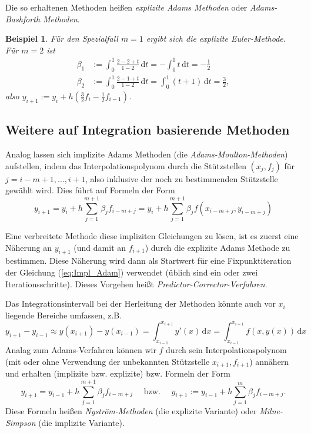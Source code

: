 \documentclass[12pt,a4paper]{book}
\theoremstyle{break}
\newtheorem{beispiel}[theorem]{Beispiel}
\theoremstyle{nonumberplain}
\newcommand{\1}{\mathbbm{1}} 			      	%
\newcommand{\dx}[1][x]{\ensuremath{\, \mathrm{d} #1}} 	%
\newcommand{\labeq}[1]{\label{eq:#1}}			%
\newcommand{\req}[1]{(\ref{eq:#1})}
\begin{document}
Die so erhaltenen Methoden heißen \emph{explizite Adams Methoden} oder \emph{Adams-Bashforth Methoden}. 
\begin{beispiel}
Für den Spezialfall $m=1$ ergibt sich die explizite Euler-Methode.
Für $m=2$ ist
\begin{align*}
\beta_1&:= \int_0^1 \frac{2-2+t}{1-2}\dx[t]=-\int_0^1 t\dx[t]=-\frac{1}{2}\\
\beta_2&:= \int_0^1 \frac{2-1+t}{1-2}\dx[t]=\int_0^1 (t+1)\dx[t]=\frac{3}{2},
\end{align*}
also $y_{i+1}:=y_i + h (\frac{3}{2}f_i-\frac{1}{2}f_{i-1})$.
\end{beispiel}

\subsection{Weitere auf Integration basierende Methoden}\label{subsect:multistep_int}

Analog lassen sich implizite Adams Methoden (die \emph{Adams-Moulton-Methoden}) aufstellen,
indem das Interpolationspolynom durch die Stützstellen $(x_j,f_j)$ für $j=i-m+1,\ldots,i+1$,
also inklusive der noch zu bestimmenden Stützstelle gewählt wird. Dies führt auf Formeln 
der Form 
\begin{equation}\labeq{Impl_Adam}
y_{i+1}=y_i+h\sum_{j=1}^{m+1}\beta_j f_{i-m + j}
=y_i+h\sum_{j=1}^{m+1}\beta_j f(x_{i-m+j},y_{i-m+j})
\end{equation}

Eine verbreitete Methode diese impliziten Gleichungen zu lösen, ist es zuerst eine Näherung an
$y_{i+1}$ (und damit an $f_{i+1}$) durch die explizite Adams Methode zu bestimmen. Diese Näherung
wird dann als Startwert für eine Fixpunktiteration der Gleichung \req{Impl_Adam} verwendet
(üblich sind ein oder zwei Iterationsschritte).
Dieses Vorgehen heißt \emph{Predictor-Corrector-Verfahren}.

Das Integrationsintervall bei der Herleitung der Methoden könnte auch vor $x_i$ liegende
Bereiche umfassen, z.B.
\[
y_{i+1}-y_{i-1}\approx y(x_{i+1})-y(x_{i-1})=\int_{x_{i-1}}^{x_{i+1}} y'(x) \dx
=\int_{x_{i-1}}^{x_{i+1}} f(x,y(x)) \dx[x]
\]
Analag zum Adams-Verfahren können wir $f$ durch sein Interpolationspolynom (mit oder ohne
Verwendung der unbekannten Stützstelle $x_{i+1},f_{i+1}$) annähern und erhalten 
(implizite bzw. explizite) bzw. Formeln der Form
\begin{equation*}
y_{i+1}=y_{i-1}+h\sum_{j=1}^{m+1}\beta_j f_{i-m + j} \quad \mbox{ bzw. } \quad
y_{i+1}:=y_{i-1}+h\sum_{j=1}^{m}\beta_j f_{i-m + j}.
\end{equation*}
Diese Formeln heißen \emph{Nyström-Methoden} (die explizite Variante) oder \emph{Milne-Simpson}
(die implizite Variante).
\end{document}

